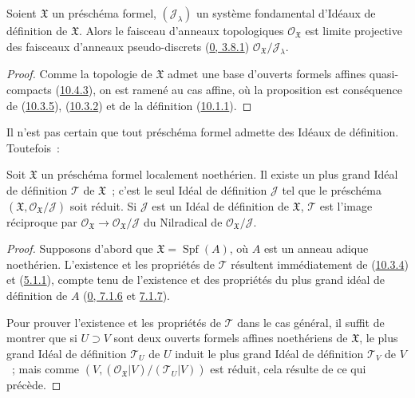 \begin{proposition}[10.5.3]
\label{I.10.5.3-fr}
Soient $\mathfrak{X}$ un préschéma formel, $(\mathscr{J}_\lambda)$ un
système fondamental d'Idéaux de définition de $\mathfrak{X}$. Alors le
faisceau d'anneaux topologiques $\mathscr{O}_{\mathfrak{X}}$ est limite
projective des faisceaux d'anneaux pseudo-discrets
(\hyperref[0.3.8.1-fr]{0, 3.8.1})
$\mathscr{O}_{\mathfrak{X}}/\mathscr{J}_\lambda$.
\end{proposition}

\begin{proof}
Comme la topologie de $\mathfrak{X}$ admet une base d'ouverts formels
affines quasi-compacts (\hyperref[I.10.4.3-fr]{10.4.3}), on est ramené au
cas affine, où la proposition est conséquence de
(\hyperref[I.10.3.5-fr]{10.3.5}),
(\hyperref[I.10.3.2-fr]{10.3.2}) et de la définition
(\hyperref[I.10.1.1-fr]{10.1.1}).
\end{proof}

Il n'est pas certain que tout préschéma formel admette des Idéaux de
définition. Toutefois~:

\begin{proposition}[10.5.4]
\label{I.10.5.4-fr}
Soit $\mathfrak{X}$ un préschéma formel localement noethérien. Il existe
un plus grand Idéal de définition $\mathscr{T}$ de $\mathfrak{X}$~;
c'est le seul Idéal de définition $\mathscr{J}$ tel que le préschéma
$(\mathfrak{X},\mathscr{O}_{\mathfrak{X}}/\mathscr{J})$ soit réduit. Si
$\mathscr{J}$ est un Idéal de définition de $\mathfrak{X}$,
$\mathscr{T}$ est l'image réciproque par
$\mathscr{O}_{\mathfrak{X}}\to
\mathscr{O}_{\mathfrak{X}}/\mathscr{J}$ du Nilradical de
$\mathscr{O}_{\mathfrak{X}}/\mathscr{J}$.
\end{proposition}

\begin{proof}
Supposons d'abord que $\mathfrak{X}=\operatorname{Spf}(A)$, où $A$ est
un anneau adique noethérien. L'existence et les propriétés de
$\mathscr{T}$ résultent immédiatement de
(\hyperref[I.10.3.4-fr]{10.3.4}) et
(\hyperref[I.5.1.1-fr]{5.1.1}), compte tenu de l'existence et des
propriétés du plus grand idéal de définition de $A$
(\hyperref[0.7.1.6-fr]{0, 7.1.6} et
\hyperref[0.7.1.7-fr]{7.1.7}).

Pour prouver l'existence et les propriétés de $\mathscr{T}$ dans le cas
général, il suffit de montrer que si $U\supset V$ sont deux ouverts
formels affines noethériens de $\mathfrak{X}$, le plus grand Idéal de
définition $\mathscr{T}_U$ de $U$ induit le plus grand Idéal de définition
$\mathscr{T}_V$ de $V$~; mais comme
$(V,(\mathscr{O}_{\mathfrak{X}}|V)/(\mathscr{T}_U|V))$ est réduit, cela
résulte de ce qui précède.
\end{proof}

